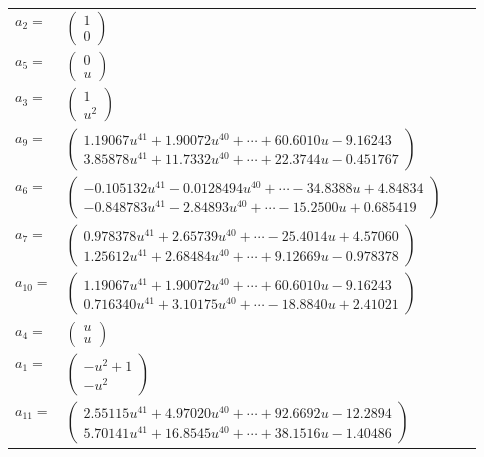 \documentclass[1p]{elsarticle_modified}
\theoremstyle{definition}
\begin{document}
\begin{tabular}{m{7pt} m{180pt} m{7pt} m{180pt} }
\flushright $a_{2}=$&$\begin{pmatrix}1\\0\end{pmatrix}$ \\
\flushright $a_{5}=$&$\begin{pmatrix}0\\u\end{pmatrix}$ \\
\flushright $a_{3}=$&$\begin{pmatrix}1\\u^2\end{pmatrix}$ \\
\flushright $a_{9}=$&$\begin{pmatrix}1.19067 u^{41}+1.90072 u^{40}+\cdots+60.6010 u-9.16243\\3.85878 u^{41}+11.7332 u^{40}+\cdots+22.3744 u-0.451767\end{pmatrix}$ \\
\flushright $a_{6}=$&$\begin{pmatrix}-0.105132 u^{41}-0.0128494 u^{40}+\cdots-34.8388 u+4.84834\\-0.848783 u^{41}-2.84893 u^{40}+\cdots-15.2500 u+0.685419\end{pmatrix}$ \\
\flushright $a_{7}=$&$\begin{pmatrix}0.978378 u^{41}+2.65739 u^{40}+\cdots-25.4014 u+4.57060\\1.25612 u^{41}+2.68484 u^{40}+\cdots+9.12669 u-0.978378\end{pmatrix}$ \\
\flushright $a_{10}=$&$\begin{pmatrix}1.19067 u^{41}+1.90072 u^{40}+\cdots+60.6010 u-9.16243\\0.716340 u^{41}+3.10175 u^{40}+\cdots-18.8840 u+2.41021\end{pmatrix}$ \\
\flushright $a_{4}=$&$\begin{pmatrix}u\\u\end{pmatrix}$ \\
\flushright $a_{1}=$&$\begin{pmatrix}- u^2+1\\- u^2\end{pmatrix}$ \\
\flushright $a_{11}=$&$\begin{pmatrix}2.55115 u^{41}+4.97020 u^{40}+\cdots+92.6692 u-12.2894\\5.70141 u^{41}+16.8545 u^{40}+\cdots+38.1516 u-1.40486\end{pmatrix}$ \\

\end{tabular}
\end{document}
